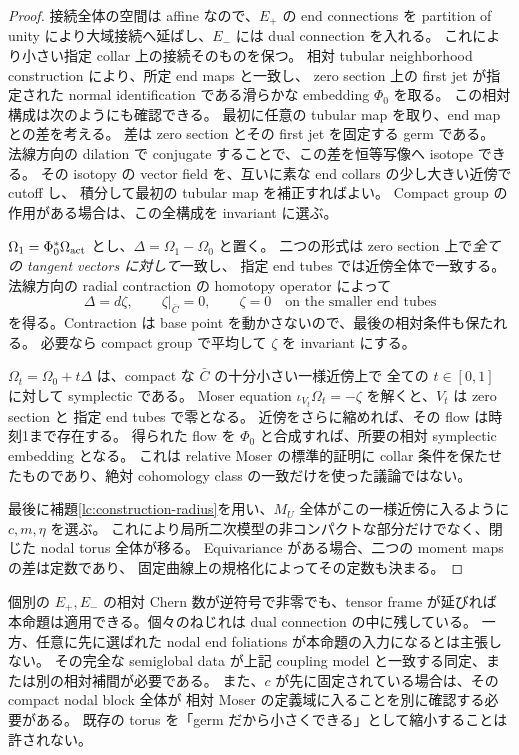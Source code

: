 \begin{proof}
接続全体の空間は affine なので、$E_+$ の end connections を
partition of unity により大域接続へ延ばし、$E_-$ には dual connection を入れる。
これにより小さい指定 collar 上の接続そのものを保つ。
相対 tubular neighborhood construction により、所定 end maps と一致し、
zero section 上の first jet が指定された normal identification である滑らかな
embedding $\Phi_0$ を取る。
この相対構成は次のようにも確認できる。
最初に任意の tubular map を取り、end map との差を考える。
差は zero section とその first jet を固定する germ である。
法線方向の dilation で conjugate することで、この差を恒等写像へ isotope できる。
その isotopy の vector field を、互いに素な end collars の少し大きい近傍で cutoff し、
積分して最初の tubular map を補正すればよい。
Compact group の作用がある場合は、この全構成を invariant に選ぶ。

$\Omega_1=\Phi_0^*\Omega_{\rm act}$ とし、$\Delta=\Omega_1-\Omega_0$ と置く。
二つの形式は zero section 上で\emph{全ての tangent vectors に対して}一致し、
指定 end tubes では近傍全体で一致する。
法線方向の radial contraction の homotopy operator によって
\[
 \Delta=d\zeta,\qquad \zeta|_{\bar C}=0,
 \qquad \zeta=0\quad\text{on the smaller end tubes}
\]
を得る。Contraction は base point を動かさないので、最後の相対条件も保たれる。
必要なら compact group で平均して $\zeta$ を invariant にする。

$\Omega_t=\Omega_0+t\Delta$ は、compact な $\bar C$ の十分小さい一様近傍上で
全ての $t\in[0,1]$ に対して symplectic である。
Moser equation $\iota_{V_t}\Omega_t=-\zeta$ を解くと、$V_t$ は zero section と
指定 end tubes で零となる。
近傍をさらに縮めれば、その flow は時刻1まで存在する。
得られた flow を $\Phi_0$ と合成すれば、所要の相対 symplectic embedding となる。
これは relative Moser の標準的証明\cite[Theorem 7.4]{cds-local}に
collar 条件を保たせたものであり、絶対 cohomology class の一致だけを使った議論ではない。

最後に補題\ref{lc:construction-radius}を用い、$M_U$ 全体がこの一様近傍に入るように
$c,m,\eta$ を選ぶ。
これにより局所二次模型の非コンパクトな部分だけでなく、閉じた nodal torus 全体が移る。
Equivariance がある場合、二つの moment maps の差は定数であり、
固定曲線上の規格化によってその定数も決まる。
\end{proof}

\begin{remark}\label{lc:construction-relative-scope}
個別の $E_+,E_-$ の相対 Chern 数が逆符号で非零でも、tensor frame が延びれば
本命題は適用できる。個々のねじれは dual connection の中に残している。
一方、任意に先に選ばれた nodal end foliations が本命題の入力になるとは主張しない。
その完全な semiglobal data が上記 coupling model と一致する同定、または別の相対補間が必要である。
また、$c$ が先に固定されている場合は、その compact nodal block 全体が
相対 Moser の定義域に入ることを別に確認する必要がある。
既存の torus を「germ だから小さくできる」として縮小することは許されない。
\end{remark}

